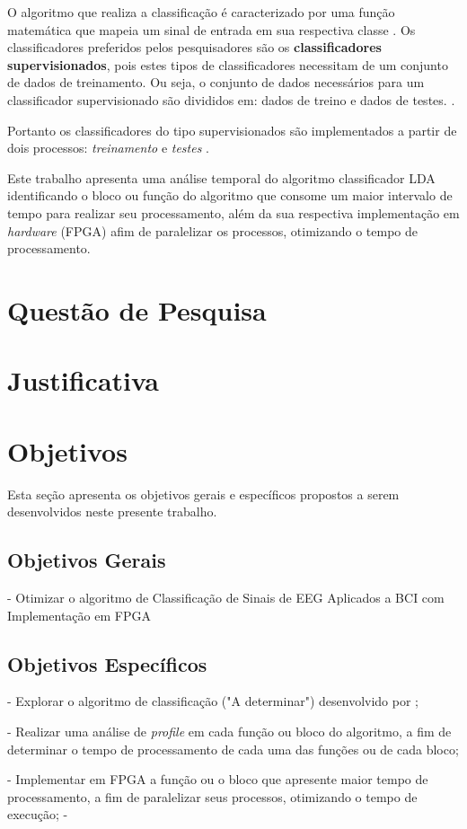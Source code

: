 O algoritmo que realiza a classificação é caracterizado por uma função matemática que mapeia um sinal de entrada em sua respectiva classe \cite{lottephd}. Os classificadores preferidos pelos pesquisadores são os \textbf{classificadores supervisionados}, pois estes tipos de classificadores necessitam de um conjunto de dados de treinamento. Ou seja, o conjunto de dados necessários para um classificador supervisionado são divididos em: dados de treino e dados de testes. \cite{Siulybook}.

Portanto os classificadores do tipo supervisionados são implementados a partir de dois processos: \textit{treinamento} e \textit{testes} \cite{Siulybook}.



Este trabalho apresenta uma análise temporal do algoritmo classificador LDA identificando o bloco ou função do algoritmo que consome um maior intervalo de tempo para realizar seu processamento, além da sua respectiva implementação em \textit{hardware} (FPGA) afim de paralelizar os processos, otimizando o tempo de processamento.

\section{Questão de Pesquisa}
\section{Justificativa}
\section{Objetivos}
Esta seção apresenta os objetivos gerais e específicos propostos a serem desenvolvidos neste presente trabalho.
\subsection{Objetivos Gerais}
- Otimizar o algoritmo de Classificação de Sinais de EEG Aplicados a BCI com Implementação em FPGA
\subsection{Objetivos Específicos}
- Explorar o algoritmo de classificação ("A determinar") desenvolvido por \cite{F.Lotte};

- Realizar uma análise de \textit{profile} em cada função ou bloco do algoritmo, a fim de determinar o tempo de processamento de cada uma das funções ou de cada bloco; 

- Implementar em FPGA a função ou o bloco que apresente maior tempo de processamento, a fim de paralelizar seus processos, otimizando o tempo de execução;
- 